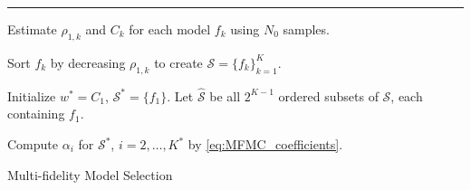 \documentclass[final,3p,times,11pt]{elsarticle}
\begin{document}
\normalem
\begin{algorithm}[!ht]
\label{algo:MFMC_Algo_model_selection}
\DontPrintSemicolon    
   \vspace{1ex}
    
    \vspace{1ex}
    \hrule \vspace{1ex}

   Estimate $\rho_{1,k}$ and $C_k$ for each model $f_k$ using $N_0$ samples.
   
   
   Sort $f_k$ by decreasing $\rho_{1,k}$ to create $\mathcal{S}=\{f_k\}_{k=1}^K$. 
   
   Initialize $w^*=C_1$, $\mathcal{S}^*=\{f_1\}$. Let $ \mathcal{\widehat S}$ be all $2^{K-1}$ ordered subsets of $\mathcal{S}$, each containing $f_1$. 

    Compute $\alpha_i$ for $\mathcal{S}^*$, $i=2,\dots, K^*$ by \eqref{eq:MFMC_coefficients}.
\caption{Multi-fidelity Model Selection}
\end{algorithm}
\ULforem
\end{document}
